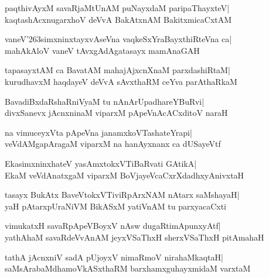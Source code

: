 \documentclass[twoside,12pt,openright]{book}
\def\S{\char'263}
\newcounter{shloka}[chapter]
\begin{document}
\begin{shloka}%
paqthivAyxM savaRjaMtUnAM puNayxdaM paripaThayxteV|\\
kaqtashAcxnugarxhoV deVvA BakAtxnAM BakitxmicaCxtAM
\end{shloka}

\begin{shloka}%
vaneV\S simxninxtayxvAseVna vaqkeSxYraBayxthiRteVna ca|\\
mahAkAloV vaneV tAvxgAdAgatasayx mamAnaGAH
\end{shloka}

\begin{shloka}%
tapasayxtAM ca BavatAM mahajAjxcnXnaM parxdashiRtaM|\\
kurudhavxM haqdayeV deVvA sAvxthaRM ceYva parAthaRkaM
\end{shloka}

\begin{shloka}%
BavadiBxdaRshaRniVyaM tu nAnArUpadhareYBuRvi|\\
divxSanevx jAcnxninaM viparxM pApeVnAcACxditoV naraH
\end{shloka}

\begin{shloka}%
na vimuceyxVta pApeVna janamxkoVTashateYrapi|\\
veVdAMgapAragaM viparxM na hanAyxnanx ca dUSayeVtf
\end{shloka}

\begin{shloka}%
EkasimxninxhateV yasAmxtokxVTiBaRvati GAtikA|\\
EkaM veVdAnatxgaM viparxM BoVjayeVcaCxrXdadhxyAnivxtaH
\end{shloka}

\begin{shloka}%
tasayx BukAtx BaveVtokxVTiviRpArxNAM nAtarx saMshayaH|\\
yaH pAtarxpUraNiVM BikASxM yatiVnAM tu parxyacaCxti
\end{shloka}

\begin{shloka}%
vimukatxH savaRpApeVBoyxV nAsw dugaRtimApunxyAtf|\\
yathAhaM savaRdeVvAnAM jeyxVSaThxH sherxVSaThxH pitAmahaH
\end{shloka}

\begin{shloka}%
tathA jAcnxniV sadA pUjoyxV nimaRmoV nirahaMkaqtaH|\\
saMsArabaMdhamoVkASxthaRM barxhamxguhayxmidaM varxtaM
\end{shloka}
\end{document}
